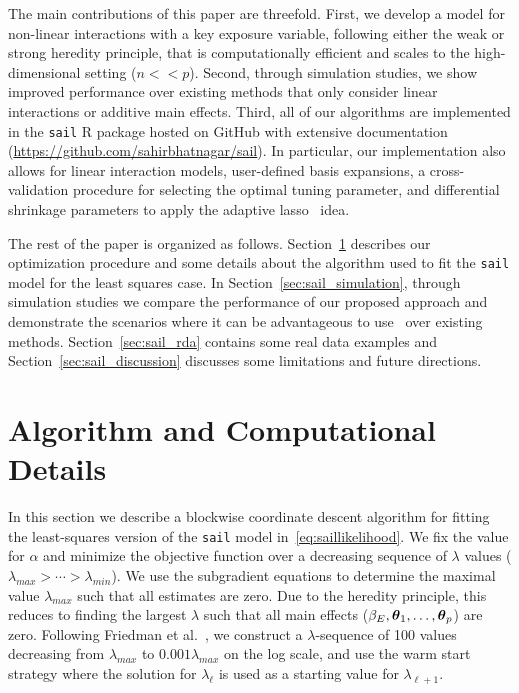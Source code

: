 The main contributions of this paper are threefold. 
First, we develop a model for non-linear interactions with a key exposure variable, following either the weak or strong heredity principle, that is computationally efficient and scales to the high-dimensional setting ($n << p$). 
Second, through simulation studies, we show improved performance over existing methods that only consider linear interactions or additive main effects. 
Third, all of our algorithms are implemented in the \texttt{sail} R package hosted on GitHub with extensive documentation (\url{https://github.com/sahirbhatnagar/sail}). In particular, our implementation also allows for linear interaction models, user-defined basis expansions, a cross-validation procedure for selecting the optimal tuning parameter, and differential shrinkage parameters to apply the adaptive lasso~\citep{zou2006adaptive} idea. 

The rest of the paper is organized as follows. Section~\ref{sec:sail_algorithm} describes our optimization procedure and some details about the algorithm used to fit the \texttt{sail} model for the least squares case. In Section~\ref{sec:sail_simulation}, through simulation studies we compare the performance of our proposed approach and demonstrate the scenarios where it can be advantageous to use \sail ~over existing methods. Section~\ref{sec:sail_rda} contains some real data examples and Section~\ref{sec:sail_discussion} discusses some limitations and future directions. 

\section{Algorithm and Computational Details} \label{sec:sail_algorithm}

In this section we describe a blockwise coordinate descent algorithm for fitting the least-squares version of the \texttt{sail} model in~\eqref{eq:saillikelihood}. We fix the value for $\alpha$ and minimize the objective function over a decreasing sequence of $\lambda$ values ($\lambda_{max}>\cdots>\lambda_{min}$). We use the subgradient equations to determine the maximal value $\lambda_{max}$ such that all estimates are zero. Due to the heredity principle, this reduces to finding the largest $\lambda$ such that all main effects ($\beta_E, \boldsymbol{\theta}_1, \ldots, \boldsymbol{\theta}_p$) are zero. Following Friedman et al.~\citep{friedman2010regularization}, we construct a $\lambda$-sequence of 100 values decreasing from $\lambda_{max}$ to $0.001 \lambda_{max}$ on the log scale, and use the warm start strategy where the solution for $\lambda_{\ell}$ is used as a starting value for $\lambda_{\ell + 1}$.  


